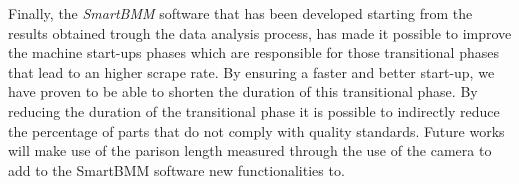 Finally, the \textit{SmartBMM} software that has been developed starting from the results obtained trough the data analysis process, has made it possible to improve the machine start-ups phases which are responsible for those transitional phases that lead to an higher scrape rate. By ensuring a faster and better start-up, we have proven to be able to shorten the duration of this transitional phase. By reducing the duration of the transitional phase it is possible to indirectly reduce the percentage of parts that do not comply with quality standards.   
Future works will make use of the parison length measured through the use of the camera to add to the SmartBMM software new functionalities to. 


